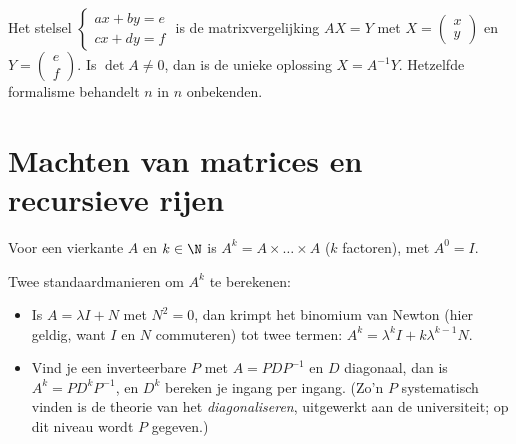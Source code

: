 \begin{method}\label{met:g12:matrix:systems}
Het stelsel $\begin{cases} ax + by = e\\ cx + dy = f \end{cases}$ is de
matrixvergelijking $AX = Y$ met
$X = \begin{pmatrix} x \\ y\end{pmatrix}$ en
$Y = \begin{pmatrix} e \\ f\end{pmatrix}$. Is $\det A \neq 0$, dan is de
unieke oplossing $X = A^{-1}Y$. Hetzelfde formalisme behandelt $n$
 in $n$ onbekenden.
\end{method}

\section{Machten van matrices en recursieve rijen}

\begin{definition}\label{def:g12:matrix:power}
Voor een vierkante  $A$ en $k \in \N$ is
$A^k = A \times \dots \times A$ ($k$ factoren), met $A^0 = I$.
\end{definition}

\begin{method}\label{met:g12:matrix:powers}
Twee standaardmanieren om $A^k$ te berekenen:
\begin{itemize}
  \item Is $A = \lambda I + N$ met $N^2 = 0$, dan krimpt het binomium van
        Newton (hier geldig, want $I$ en $N$ commuteren) tot twee termen:
        $A^k = \lambda^k I + k \lambda^{k-1} N$.
  \item Vind je een inverteerbare $P$ met $A = PDP^{-1}$ en $D$ diagonaal, dan
        is $A^k = P D^k P^{-1}$, en $D^k$ bereken je ingang per ingang.
        (Zo'n $P$ systematisch vinden is de theorie van het
        \emph{diagonaliseren}, uitgewerkt aan de universiteit; op dit niveau
        wordt $P$ gegeven.)
\end{itemize}
\end{method}

